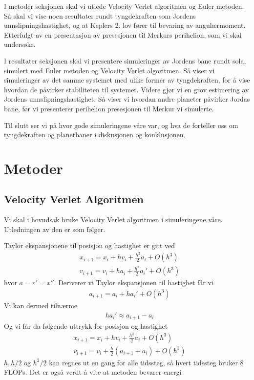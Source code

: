 \documentclass[reprint,english,notitlepage]{revtex4-1}
\begin{document}
	I metoder seksjonen skal vi utlede Velocity Verlet algoritmen og Euler metoden. Så skal vi vise noen resultater rundt tyngdekraften som Jordens unnslipningshastighet, og at Keplers 2. lov fører til bevaring av angulærmoment. Etterfulgt av en presentasjon av presesjonen til Merkurs perihelion, som vi skal undersøke.
	
	I resultater seksjonen skal vi presentere simuleringer av Jordens bane rundt sola, simulert med Euler metoden og Velocity Verlet algoritmen. Så viser vi simuleringer av det samme systemet med ulike former av tyngdekraften, for å vise hvordan de påvirker stabiliteten til systemet. Videre gjør vi en grov estimering av Jordens unnslipningshastighet. Så viser vi hvordan andre planeter påvirker Jordas bane, før vi presenterer perihelion presesjonen til Merkur vi simulerte.
	
	Til slutt ser vi på hvor gode simuleringene våre var, og hva de forteller oss om tyngdekraften og planetbaner i diskusjonen og konklusjonen.

\section{Metoder} %
	
	
\subsection{Velocity Verlet Algoritmen}
	Vi skal i hovudsak bruke Velocity Verlet algoritmen i simuleringene våre. Utledningen av den er som følger.
	
	Taylor ekspansjonene til posisjon og hastighet er gitt ved
	\begin{equation}
	\label{eq:taylor}
	\begin{aligned}
	&x_{i+1} = x_i + h v_i + \frac{h^2}{2}a_i + O(h^3) \\
	&v_{i+1} = v_i + h a_i + \frac{h^2}{2}a_i' + O(h^3)
	\end{aligned}
	\end{equation}
	hvor $a = v' = x''$. Deriverer vi Taylor ekspansjonen til hastighet får vi
	\begin{equation*}
	\begin{aligned}
	&a_{i+1} = a_i + h a_i' + O(h^3)
	\end{aligned}
	\end{equation*}
	Vi kan dermed tilnærme
	\begin{equation*}
	\begin{aligned}
	&ha_{i}' \approx a_{i + 1} - a_i
	\end{aligned}
	\end{equation*}
	Og vi får da følgende uttrykk for posisjon og hastighet
	\begin{equation*}
	\begin{aligned}
	&x_{i+1} = x_i + hv_i + \frac{h^2}{2}a_i + O(h^3) \\
	&v_{i+1} = v_i + \frac{h}{2}(a_{i+1} + a_i) + O(h^3)
	\end{aligned}
	\end{equation*}
	$h, h/2$ og $h^2/2$ kan regnes ut en gang for alle tidssteg, så hvert tidssteg bruker 8 FLOPs. Det er også verdt å vite at metoden bevarer energi \cite{energi}
	
\end{document}
